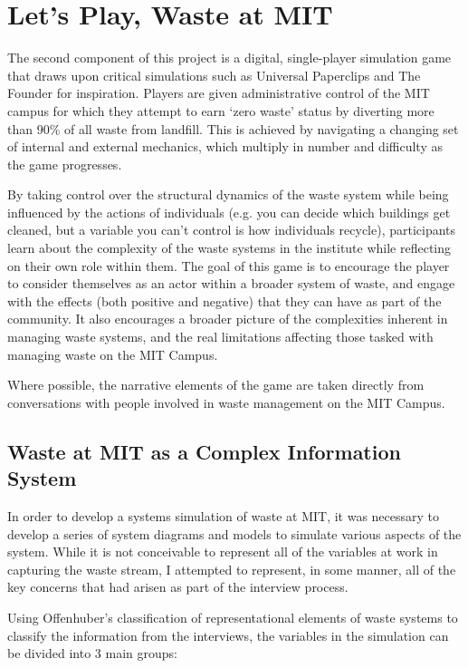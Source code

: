 \documentclass[nofonts,nols,justified,nobib]{tufte-book}
\begin{document}
\newpage

\section*{Let's Play, Waste at MIT}

The second component of this project is a digital, single-player simulation game that draws upon critical simulations such as Universal Paperclips and The Founder for inspiration. Players are given administrative control of the MIT campus for which they attempt to earn `zero waste' status by diverting more than 90\% of all waste from landfill. This is achieved by navigating a changing set of internal and external mechanics, which multiply in number and difficulty as the game progresses.

By taking control over the structural dynamics of the waste system while being influenced by the actions of individuals (e.g. you can decide which buildings get cleaned, but a variable you can't control is how individuals recycle), participants learn about the complexity of the waste systems in the institute while reflecting on their own role within them. The goal of this game is to encourage the player to consider themselves as an actor within a broader system of waste, and engage with the effects (both positive and negative) that they can have as part of the community. It also encourages a broader picture of the complexities inherent in managing waste systems, and the real limitations affecting those tasked with managing waste on the MIT Campus.

Where possible, the narrative elements of the game are taken directly from conversations with people involved in waste management on the MIT Campus.

\subsection*{Waste at MIT as a Complex Information System}

In order to develop a systems simulation of waste at MIT, it was necessary to develop a series of system diagrams and models to simulate various aspects of the system. While it is not conceivable to represent all of the variables at work in capturing the waste stream, I attempted to represent, in some manner, all of the key concerns that had arisen as part of the interview process. 

Using Offenhuber's classification of representational elements of waste systems to classify the information from the interviews, the variables in the simulation can be divided into 3 main groups:
\end{document}
